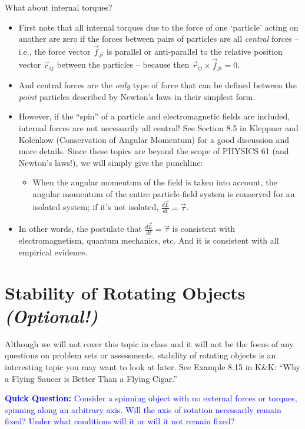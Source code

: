 \documentclass[11pt, letterpaper, openany]{book}
\begin{document}
What about internal torques?
\begin{itemize}
    \item First note that all internal torques due to the force of one `particle' acting on another are zero if the forces between pairs of particles are all \textit{central} forces -- i.e., the force vector $\vec{f}_{ji}$ is parallel or anti-parallel to the relative position vector $\vec{r}_{ij}$ between the particles -- because then $\vec{r}_{ij} \times \vec{f}_{ji} = 0$.
    \item And central forces are the \textit{only} type of force that can be defined between the \textit{point} particles described by Newton's laws in their simplest form.
    \item However, if the ``spin'' of a particle and electromagnetic fields are included, internal forces are not necessarily all central! See Section 8.5 in Kleppner and Kolenkow (Conservation of Angular Momentum) for a good discussion and more details. Since these topics are beyond the scope of PHYSICS 61 (and Newton's laws!), we will simply give the punchline:
    \begin{itemize}
        \item When the angular momentum of the field is taken into account, the angular momentum of the entire particle-field system is conserved for an isolated system; if it's not isolated, $\frac{d\vec{L}}{dt} = \vec{\tau}$.
    \end{itemize}
    \item In other words, the postulate that $\frac{d\vec{L}}{dt} = \vec{\tau}$ is consistent with electromagnetism, quantum mechanics, etc. And it is consistent with all empirical evidence.
\end{itemize}

\section*{Stability of Rotating Objects \textit{(Optional!)}}

Although we will not cover this topic in class and it will not be the focus of any questions on problem sets or assessments, stability of rotating objects is an interesting topic you may want to look at later. See Example 8.15 in K\&K: ``Why a Flying Saucer is Better Than a Flying Cigar.''

\textcolor{blue}{\textbf{Quick Question:} Consider a spinning object with no external forces or torques, spinning along an arbitrary axis. Will the axis of rotation necessarily remain fixed? Under what conditions will it or will it not remain fixed?}
\end{document}
